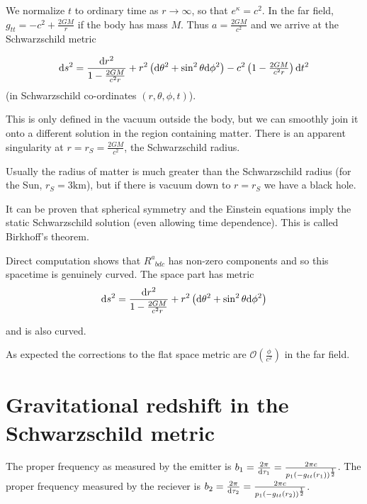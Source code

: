 \documentclass{notes}
\newcommand{\cO}{\mathcal{O}}
\begin{document}
We normalize $t$ to ordinary time as $r \to \infty$, so that
$e^\kappa = c^2$.  In the far field, $g_{tt} = - c^2 + \tfrac{2 G M}{r}$
if the body has mass $M$.  Thus $a = \tfrac{2 G M}{c^2}$ and we
arrive at the Schwarzschild metric

\begin{equation}\label{eq:Schwarz}
\mathrm{d} s^2 = \frac{\mathrm{d} r^2}{1 - \tfrac{2 G M}{c^2 r}} + r^2 \left(
\mathrm{d} \theta^2 + \sin^2 \theta \mathrm{d} \phi^2 \right) - c^2
\left( 1 - \tfrac{2 G M}{c^2 r} \right) \mathrm{d} t^2
\end{equation}
(in Schwarzschild co-ordinates $(r,\theta,\phi,t)$).

This is only defined in the vacuum outside the body, but we can smoothly
join it onto a different solution in the region containing matter.
There is an apparent singularity at $r = r_S = \tfrac{2 G M}{c^2}$,
the Schwarzschild radius.

Usually the radius of matter is much greater than the Schwarzschild
radius (for the Sun, $r_S = 3 \mathrm{km}$), but if there is vacuum down
to $r = r_S$ we have a black hole.

It can be proven that spherical symmetry and the Einstein equations
imply the static Schwarzschild solution (even allowing time dependence).
This is called Birkhoff's theorem.

Direct computation shows that $R^a_{\phantom{a}b dc}$
has non-zero components and so this spacetime is genuinely curved.
The space part has metric
\[
\mathrm{d} s^2 = \frac{\mathrm{d} r^2}{1 - \frac{2 G M}{c^2 r}} + r^2 \left(
\mathrm{d} \theta^2 + \sin^2 \theta \mathrm{d} \phi^2\right)
\]

and is also curved.

As expected the corrections to the flat space metric are
$\cO(\tfrac{\phi}{c^2})$ in the far field.

\section[Gravitational redshift]%
{Gravitational redshift in the Schwarzschild metric}

\vspace{1.5in}

The proper frequency as measured by the emitter is
$b_1 = \tfrac{2 \pi}{\mathrm{d} \tau_1} = \tfrac{2 \pi c}{p_1
\left( - g_{tt}(r_1) \right)^{\frac{1}{2}}}$.  The
proper frequency measured by the reciever is
$b_2 = \tfrac{2 \pi}{\mathrm{d} \tau_2} = \tfrac{2 \pi c}{p_1
\left( - g_{tt}(r_2) \right)^{\frac{1}{2}}}$.
\end{document}
